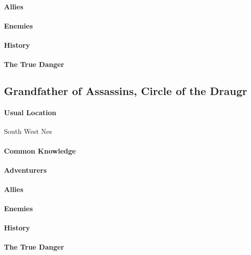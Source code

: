 \begin{multicols}{2}
    \paragraph{Allies}
    \paragraph{Enemies}
    \paragraph{History}
    \paragraph{The True Danger} 
    
\subsection{Grandfather of Assassins, Circle of the Draugr}
    \paragraph{Usual Location} South West Nes
    \paragraph{Common Knowledge} 
    \paragraph{Adventurers}
    \paragraph{Allies}
    \paragraph{Enemies}
    \paragraph{History}
    \paragraph{The True Danger}   
     

\end{multicols}
